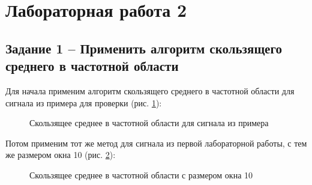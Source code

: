\documentclass[a4paper,oneside,14pt]{extreport}
\begin{document}


\chapter*{Лабораторная работа 2}
\section*{Задание 1 – Применить алгоритм скользящего среднего в частотной области}

Для начала применим алгоритм скользящего среднего в частотной области для сигнала из примера для проверки (рис. \ref{task1_not_my_signal}):

\begin{figure}[h]
	\caption{Скользящее среднее в частотной области для сигнала из примера}
	\label{task1_not_my_signal}
\end{figure}

\newpage
Потом применим тот же метод для сигнала из первой лабораторной работы, с тем же размером окна 10 (рис. \ref{task1_my_signal}):

\begin{figure}[h]
	\caption{Скользящее среднее в частотной области с размером окна 10}
	\label{task1_my_signal}
\end{figure}
\end{document}
